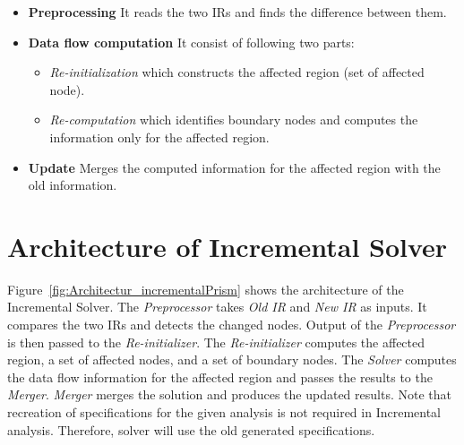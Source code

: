 \documentclass[11pt,a4paper,openright]{report}
\begin{document}
\begin{itemize}
\item \textbf{Preprocessing} It reads the two IRs and finds the difference between them.

\item \textbf{Data flow computation}
It consist of following two parts:
\begin{itemize}
 \item \textit{Re-initialization} which constructs the affected region (set of affected node).
 \item  \textit{Re-computation} which identifies boundary nodes and computes the information only for the affected region.
\end{itemize}

\item \textbf{Update} Merges the computed information for the affected region with the old information.

\end{itemize}


\section{Architecture of Incremental Solver}
Figure~\ref{fig:Architectur_incrementalPrism} shows the architecture of the Incremental Solver. The \textit{Preprocessor}
takes \textit{Old IR} and \textit{New IR} as inputs. It compares the two IRs and detects the changed nodes. 
Output of the \textit{Preprocessor} is then passed to the \textit{Re-initializer}. The \textit{Re-initializer} computes 
the affected region, a set of affected nodes, and a set of boundary nodes. The \textit{Solver} computes the data flow information
for the affected region and passes the results to the \textit{Merger}. \textit{Merger} merges the solution and produces the updated results.
Note that recreation of specifications for the given analysis is not required in Incremental analysis. Therefore, solver will use the old generated specifications.
\end{document}
